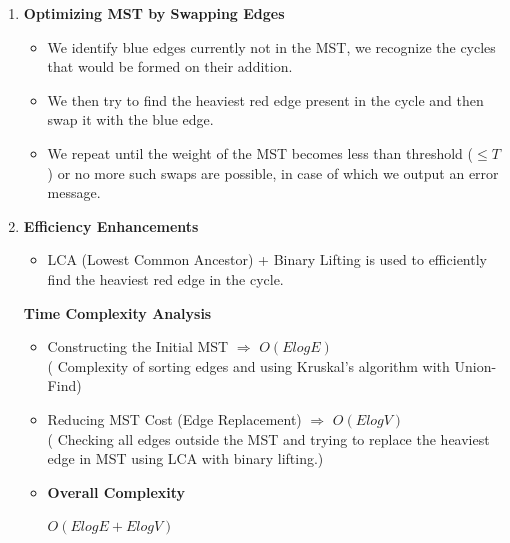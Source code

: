 \documentclass{report}
\begin{document}
\begin{titlepage}
{\begin{enumerate}
            \item \textbf{Optimizing MST by Swapping Edges}
                  \begin{itemize}
                      \item We identify blue edges currently not in the MST,
                            we
                            recognize the cycles that would be formed on their
                            addition.
                      \item We then try to find the heaviest red edge present
                            in
                            the
                            cycle and then swap it with the blue edge.
                      \item We repeat until the weight of the MST becomes less
                            than
                            threshold ($\le T$) or no more such swaps are
                            possible, in case of which we
                            output an error message.
                  \end{itemize}

            \item \textbf{Efficiency Enhancements}
                  \begin{itemize}
                      \item LCA (Lowest Common Ancestor) + Binary Lifting is
                            used
                            to efficiently find the heaviest red edge in the
                            cycle.
                  \end{itemize}

                  \textbf{Time Complexity Analysis}
                  \begin{itemize}
                      \item Constructing the Initial MST $\Longrightarrow$
                            $O(ElogE)$
                            \\({\fontsize{11}{16} \selectfont Complexity of
                                    sorting edges and using Kruskal's
                                    algorithm with Union-Find})
                      \item Reducing MST Cost (Edge Replacement)
                            $\Longrightarrow$ $O(ElogV)$
                            \\ ({\fontsize{11}{16} \selectfont Checking all
                                    edges
                                    outside the MST and trying
                                    to replace the heaviest edge in MST using
                                    LCA
                                    with
                                    binary lifting.})
                      \item \textbf{Overall Complexity}
                            \begin{center}
                                $O(ElogE+ElogV)$
                            \end{center}
                  \end{itemize}
        \end{enumerate}
    }


\end{titlepage}
\end{document}
